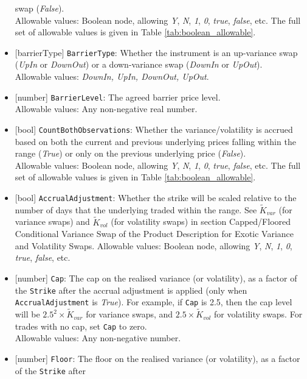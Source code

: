\begin{itemize}
  swap (\emph{False}). \\
  Allowable values: Boolean node, allowing \emph{Y}, \emph{N}, \emph{1}, \emph{0}, \emph{true}, \emph{false}, etc.
  The full set of allowable values is given in Table \ref{tab:boolean_allowable}.
  \item{}[barrierType] \lstinline!BarrierType!: Whether the instrument is an up-variance swap (\emph{UpIn} or \emph{DownOut}) or 
  a down-variance swap (\emph{DownIn} or \emph{UpOut}). \\
  Allowable values: \emph{DownIn, UpIn, DownOut, UpOut}.
  \item{}[number] \lstinline!BarrierLevel!: The agreed barrier price level. \\
  Allowable values: Any non-negative real number.
  \item{}[bool] \lstinline!CountBothObservations!: Whether the variance/volatility is accrued based on both the current and
  previous underlying prices falling within the range (\emph{True}) or only on the previous underlying price
  (\emph{False}). \\
  Allowable values: Boolean node, allowing \emph{Y}, \emph{N}, \emph{1}, \emph{0}, \emph{true}, \emph{false}, etc.
  The full set of allowable values is given in Table \ref{tab:boolean_allowable}.
  \item{}[bool] \lstinline!AccrualAdjustment!: Whether the strike will be scaled relative to the number of days that the
  underlying traded within the range. See $\widetilde{K}_{var}$ (for variance swaps) and $\widetilde{K}_{vol}$
  (for volatility swaps) in section Capped/Floored Conditional Variance Swap of the Product Description for
  Exotic Variance and Volatility Swaps.
  Allowable values: Boolean node, allowing \emph{Y}, \emph{N}, \emph{1}, \emph{0}, \emph{true}, \emph{false}, etc.
  \item{}[number] \lstinline!Cap!: The cap on the realised variance (or volatility), as a factor of the \lstinline!Strike! after
  the accrual adjustment is applied (only when \lstinline!AccrualAdjustment! is \emph{True}). For example,
  if \lstinline!Cap! is 2.5, then the cap level will be $2.5^2 \times \widetilde{K}_{var}$ for variance swaps, and
  $2.5 \times \widetilde{K}_{vol}$ for volatility swaps. For trades with no cap, set \lstinline!Cap! to zero. \\
  Allowable values: Any non-negative number.
  \item{}[number] \lstinline!Floor!: The floor on the realised variance (or volatility), as a factor of the \lstinline!Strike! after

\end{itemize}

